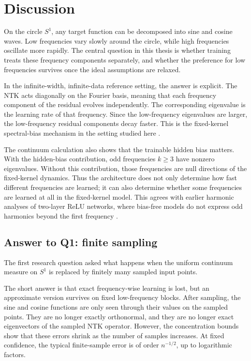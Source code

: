\chapter{Discussion}
\label{cha:discussion}

On the circle \(S^1\), any target function can be decomposed into sine and
cosine waves. Low frequencies vary slowly around the circle, while high
frequencies oscillate more rapidly. The central question in this thesis is
whether training treats these frequency components separately, and whether the
preference for low frequencies survives once the ideal assumptions are relaxed.

In the infinite-width, infinite-data reference setting, the answer is explicit.
The NTK acts diagonally on the Fourier basis, meaning that each frequency
component of the residual evolves independently. The corresponding eigenvalue is
the learning rate of that frequency. Since the low-frequency eigenvalues are
larger, the low-frequency residual components decay faster. This is the
fixed-kernel spectral-bias mechanism in the setting studied here
\citep{jacot2018ntk,lee2020wide,rahaman2019spectralbiasneuralnetworks,
	basri2019convergence,bietti2019inductivebiasneuraltangent,
	cao2020understandingspectralbiasdeep}.

The continuum calculation also shows that the trainable hidden bias matters.
With the hidden-bias contribution, odd frequencies \(k\ge 3\) have nonzero
eigenvalues. Without this contribution, those frequencies are null directions of
the fixed-kernel dynamics. Thus the architecture does not only determine how
fast different frequencies are learned; it can also determine whether some
frequencies are learned at all in the fixed-kernel model. This agrees with
earlier harmonic analyses of two-layer ReLU networks, where bias-free models do
not express odd harmonics beyond the first frequency
\citep{basri2019convergence,basri2020frequencybiasneuralnetworks}.

\section{Answer to Q1: finite sampling}
\label{sec:discussion-q1}

The first research question asked what happens when the uniform continuum
measure on \(S^1\) is replaced by finitely many sampled input points.

The short answer is that exact frequency-wise learning is lost, but an
approximate version survives on fixed low-frequency blocks. After sampling, the
sine and cosine functions are only seen through their values on the sampled
points. They are no longer exactly orthonormal, and they are no longer exact
eigenvectors of the sampled NTK operator. However, the concentration bounds show
that these errors shrink as the number of samples increases. At fixed
confidence, the typical finite-sample error is of order \(n^{-1/2}\), up to
logarithmic factors.


